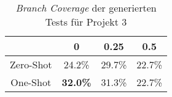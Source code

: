 \bgroup
\def\arraystretch{2}
\begin{table}[H]
	\vspace{.5cm}
	\centering		
	\begin{center}
		\begin{tabular}{|c||c|c|c|}
			\hline 
			& 0 & 0.25 & 0.5 \\
			\hline 
			\hline
			Zero-Shot & 24.2\% & 29.7\% & 22.7\% \\
			\hline
			One-Shot & \textbf{32.0\%} & 31.3\% & 22.7\% \\
			\hline
		\end{tabular} 
	\end{center}
	\caption{\textit{Branch Coverage} der generierten Tests für Projekt 3}
	\label{fig:branch-3}
	\vspace{-.8cm}
\end{table}
\egroup